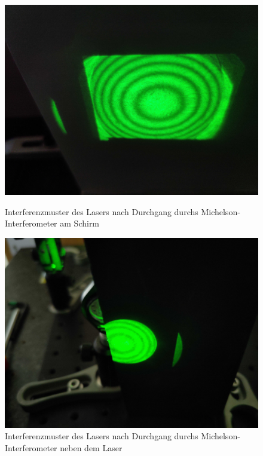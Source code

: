 \documentclass[ngerman]{scrartcl}
\begin{document}
\begin{figure}[H]
    \centering
    \begin{minipage}[t]{0.45\linewidth}
        \centering
        \includegraphics[width=\linewidth]{fig/Compressed/michelson_konz_schirm.jpg}
        \caption[Interferenzmuster Michelson-Interferometer Schirm]{Interferenzmuster des Lasers nach Durchgang durchs Michelson-Interferometer am Schirm}
        \label{fig:michelson_konz_sammel}
    \end{minipage}%
    \hspace*{\fill}
    \begin{minipage}[t]{0.45\linewidth}
        \centering
        \includegraphics[width=\linewidth]{fig/Compressed/michelson_konz_tuer.jpg}
        \caption[Interferenzmuster Michelson-Interferometer Reflexion]{Interferenzmuster des Lasers nach Durchgang durchs Michelson-Interferometer neben dem Laser}
        \label{fig:michelson_konz_sammel_tuer}
    \end{minipage}
\end{figure}
\end{document}
